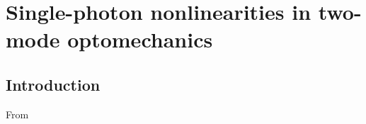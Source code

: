 \chapter{Single-photon nonlinearities in two-mode optomechanics}
\label{ch:Komar2013}

\section{Introduction}
From \cite{Komar2013}